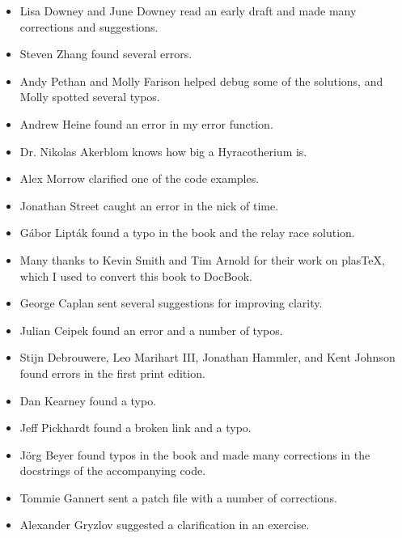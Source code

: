 \documentclass[12pt]{book}
\begin{document}
\begin{itemize}

\item Lisa Downey and June Downey read an early draft and made many
corrections and suggestions.

\item Steven Zhang found several errors.

\item Andy Pethan and Molly Farison helped debug some of the solutions,
and Molly spotted several typos.

\item Andrew Heine found an error in my error function.

\item Dr. Nikolas Akerblom knows how big a Hyracotherium is.

\item Alex Morrow clarified one of the code examples.

\item Jonathan Street caught an error in the nick of time.

\item G\'{a}bor Lipt\'{a}k found a typo in the book and the relay race solution.

\item Many thanks to Kevin Smith and Tim Arnold for their work on
plasTeX, which I used to convert this book to DocBook.

\item George Caplan sent several suggestions for improving clarity.

\item Julian Ceipek found an error and a number of typos.

\item Stijn Debrouwere, Leo Marihart III, Jonathan Hammler, and Kent Johnson
found errors in the first print edition.

\item Dan Kearney found a typo.

\item Jeff Pickhardt found a broken link and a typo.

\item J\"{o}rg Beyer found typos in the book and made many corrections
in the docstrings of the accompanying code.

\item Tommie Gannert sent a patch file with a number of corrections.

\item Alexander Gryzlov suggested a clarification in an exercise.


\end{itemize}
\end{document}
